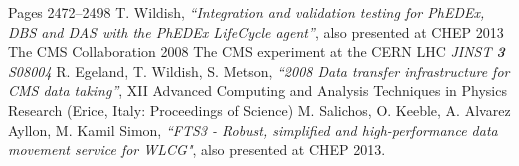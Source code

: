 \begin{thebibliography}{1}
{Pages 2472–2498}
    T. Wildish, {\it ``Integration and validation testing for PhEDEx, DBS and DAS with the PhEDEx LifeCycle agent''}, also presented at CHEP 2013
The CMS Collaboration 2008 The CMS experiment at the CERN LHC {\it JINST
{\bf 3} S08004}
    R. Egeland, T. Wildish, S. Metson, {\it ``2008 Data transfer infrastructure for CMS data taking''},  XII Advanced Computing and Analysis Techniques in Physics Research (Erice, Italy: Proceedings of Science)
    M. Salichos, O. Keeble, A. Alvarez Ayllon, M. Kamil Simon, {\it ``FTS3 - Robust, simplified and high-performance data movement service for WLCG"}, also presented at CHEP 2013.
\end{thebibliography}
